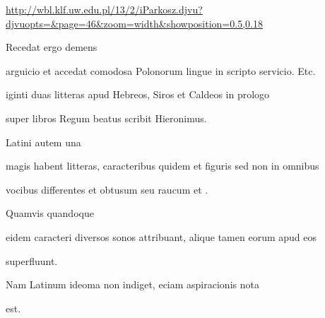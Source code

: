 \url{http://wbl.klf.uw.edu.pl/13/2/iParkosz.djvu?djvuopts=&page=46&zoom=width&showposition=0.5,0.18}


\splitpreviouslines

{
\color{blue}
Recedat ergo demens 

}




\fulllines


arguicio et accedat comodosa Polonorum lingue in scripto servicio. Etc.




iginti duas litteras apud Hebreos, Siros et Caldeos in prologo

\splitlines

super libros Regum beatus scribit Hieronimus. 


Latini autem una

\fulllines

magis habent litteras, caracteribus quidem et figuris sed non in omnibus

\splitlines

vocibus differentes et obtusum seu raucum  et . 


Quamvis quandoque

\fulllines

eidem caracteri diversos sonos attribuant, alique tamen eorum apud eos

\splitlines

superfluunt. 


\fulllines

Nam Latinum ideoma  non indiget,  eciam aspiracionis nota

\splitlines
est.

